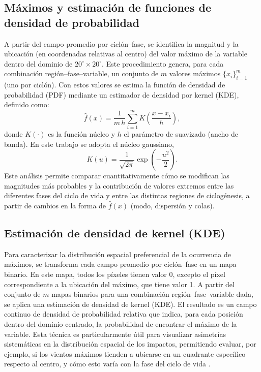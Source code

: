 \subsection{Máximos y estimación de funciones de densidad de probabilidad}\label{subsec:extraccion_pdf}

A partir del campo promedio por ciclón--fase, se identifica la magnitud y la ubicación (en coordenadas relativas al centro) del valor máximo de la variable dentro del dominio de $20^{\circ}\times 20^{\circ}$. Este procedimiento genera, para cada combinación región--fase--variable, un conjunto de $m$ valores máximos $\{x_i\}_{i=1}^{m}$ (uno por ciclón). Con estos valores se estima la función de densidad de probabilidad (PDF) mediante un estimador de densidad por kernel (KDE), definido como:
\begin{equation}
\hat{f}(x)=\frac{1}{m\,h}\sum_{i=1}^{m}K\!\left(\frac{x-x_i}{h}\right),
\label{eq:kde_pdf}
\end{equation}
donde $K(\cdot)$ es la función núcleo y $h$ el parámetro de suavizado (ancho de banda). En este trabajo se adopta el núcleo gaussiano,
\begin{equation}
K(u)=\frac{1}{\sqrt{2\pi}}\exp\!\left(-\frac{u^{2}}{2}\right).
\label{eq:gaussian_kernel}
\end{equation}
Este análisis permite comparar cuantitativamente cómo se modifican las magnitudes más probables y la contribución de valores extremos entre las diferentes fases del ciclo de vida y entre las distintas regiones de ciclogénesis, a partir de cambios en la forma de $\hat{f}(x)$ (modo, dispersión y colas).


\subsection{Estimación de densidad de kernel (KDE)}\label{subsec:kde_localizacion}

Para caracterizar la distribución espacial preferencial de la ocurrencia de máximos, se transforma cada campo promedio por ciclón--fase en un mapa binario. En este mapa, todos los píxeles tienen valor 0, excepto el píxel correspondiente a la ubicación del máximo, que tiene valor 1. A partir del conjunto de $m$ mapas binarios para una combinación región--fase--variable dada, se aplica una estimación de densidad de kernel (KDE). El resultado es un campo continuo de densidad de probabilidad relativa que indica, para cada posición dentro del dominio centrado, la probabilidad de encontrar el máximo de la variable. Esta técnica es particularmente útil para visualizar asimetrías sistemáticas en la distribución espacial de los impactos, permitiendo evaluar, por ejemplo, si los vientos máximos tienden a ubicarse en un cuadrante específico respecto al centro, y cómo esto varía con la fase del ciclo de vida \citep{gramcianinov2023impact}.


